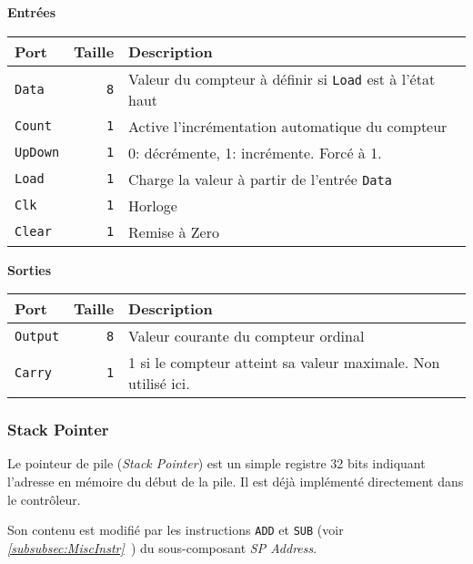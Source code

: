 
\textbf{Entrées}\\

\begin{tabular}{|l|r|l|}
\hline
\textbf{Port}		& \textbf{Taille} & \textbf{Description}\\
\hline

\texttt{Data}		&  \texttt{8} & Valeur du compteur à définir si \texttt{Load} est à l'état haut\\
\hline
\texttt{Count}		&  \texttt{1} & Active l'incrémentation automatique du compteur\\
\hline
\texttt{UpDown}		&  \texttt{1} & 0: décrémente, 1: incrémente. Forcé à 1.\\
\hline
\texttt{Load}		&  \texttt{1} & Charge la valeur à partir de l'entrée \texttt{Data}\\
\hline
\texttt{Clk}		&  \texttt{1} & Horloge\\
\hline
\texttt{Clear}		&  \texttt{1} & Remise à Zero\\
\hline


\hline
\end{tabular}

\vspace{1em}
\textbf{Sorties}\\

\begin{tabular}{|l|r|l|}
\hline 
\textbf{Port} & \textbf{Taille} & \textbf{Description}\\
\hline

\hline
\texttt{Output}		&  \texttt{8} & Valeur courante du compteur ordinal\\
\hline
\texttt{Carry}		&  \texttt{1} & 1 si le compteur atteint sa valeur maximale. Non utilisé ici.\\

\hline
\end{tabular}


\subsubsection{Stack Pointer}


Le pointeur de pile (\textit{Stack Pointer}) est un simple registre 32 bits indiquant l'adresse en mémoire du début de la pile.
Il est déjà implémenté directement dans le contrôleur.

Son contenu est modifié par les instructions \texttt{ADD} et \texttt{SUB} 
(voir \textit{\ref{subsubsec:MiscInstr}~}) du sous-composant \textit{SP Address}.

